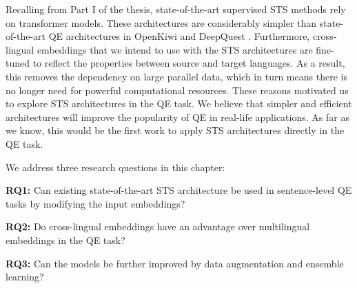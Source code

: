 Recalling from Part I of the thesis, state-of-the-art supervised STS methods rely on transformer models. These architectures are considerably simpler than state-of-the-art QE architectures in OpenKiwi \autocite{kepler-etal-2019-openkiwi} and DeepQuest  \autocite{ive-etal-2018-deepquest}. Furthermore, cross-lingual embeddings that we intend to use with the STS architectures are fine-tuned to reflect the properties between source and target languages. As a result, this removes the dependency on large parallel data, which in turn means there is no longer need for powerful computational resources. These reasons motivated us to explore STS architectures in the QE task. We believe that simpler and efficient architectures will improve the popularity of QE in real-life applications. As far as we know, this would be the first work to apply STS architectures directly in the QE task.

We address three research questions in this chapter:

\textbf{RQ1:} Can existing state-of-the-art STS architecture be used in sentence-level QE tasks by modifying the input embeddings?

\textbf{RQ2:} Do cross-lingual embeddings have an advantage over multilingual embeddings in the QE task?

\textbf{RQ3:} Can the models be further improved by data augmentation and ensemble learning?

